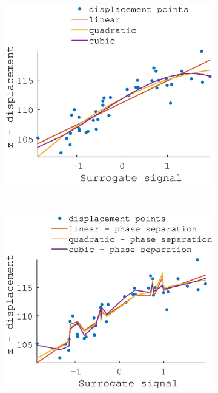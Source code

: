 \documentclass[11pt,a4paper,oneside]{report}
\begin{document}
\begin{figure}
    \hspace*{-2em}
  \begin{subfigure}[b]{0.33\textwidth}
    \includegraphics[width=\textwidth, trim=0 0 0 110,clip=true]{figures/task2/fit_round1_couch3.eps}
  \end{subfigure}%
    ~ %
  \begin{subfigure}[b]{0.33\textwidth}
    \includegraphics[width=\textwidth, trim=0 0 0 110,clip=true]{figures/task2/fit_round2_couch3.eps}

\end{subfigure}
\end{figure}
\end{document}
